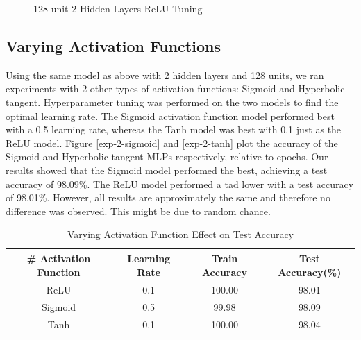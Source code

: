 \documentclass[11pt]{homework}
\begin{document}
\begin{figure}[h!]
\begin{minipage}[h]{0.3\textwidth}
    \caption{128 unit 2 Hidden Layers ReLU Tuning}
    \label{hyper-2-128-relu}
  \end{minipage}
\end{figure}





\subsection{Varying Activation Functions}
Using the same model as above with 2 hidden layers and 128 units, we ran experiments with 2 other types of activation functions: Sigmoid and Hyperbolic tangent. Hyperparameter tuning was performed on the two models to find the optimal learning rate. The Sigmoid activation function model performed best with a 0.5 learning rate, whereas the Tanh model was best with 0.1 just as the ReLU model. Figure \ref{exp-2-sigmoid} and \ref{exp-2-tanh} plot the accuracy of the Sigmoid and Hyperbolic tangent MLPs respectively, relative to epochs. Our results showed that the Sigmoid model performed the best, achieving a test accuracy of 98.09\%. The ReLU model performed a tad lower with a test accuracy of 98.01\%. However, all results are approximately the same and therefore no difference was observed. This might be due to random chance.

\begin{table}[h!] 
\centering
\begin{tabular}{||c c c c||} 
\hline
 # Activation Function & Learning Rate & Train Accuracy & Test Accuracy(\%) \\ [0.5ex]
 \hline\hline
 ReLU     & 0.1 & 100.00 & 98.01   \\
 Sigmoid  & 0.5 & 99.98  & 98.09   \\ 
 Tanh     & 0.1 & 100.00 & 98.04   \\ 
 \hline
\end{tabular}
\caption{Varying Activation Function Effect on Test Accuracy}
\label{table-varying-activations}
\end{table}
\end{document}
